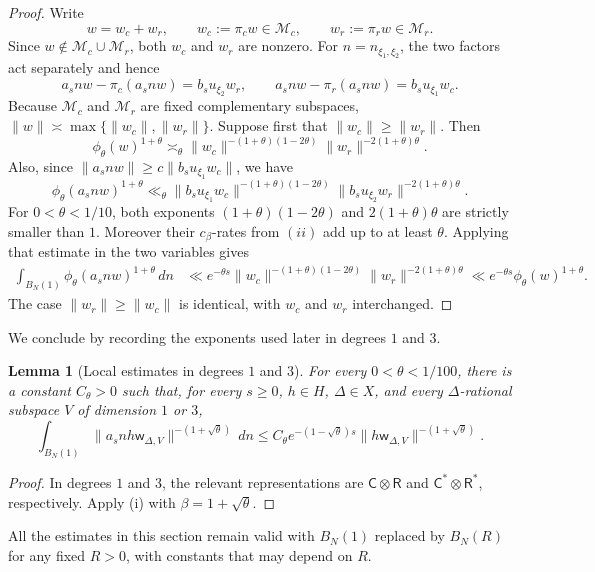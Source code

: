 \documentclass[reqno,11pt]{amsart}
\newtheorem{lem}[lem]{Lemma}
\theoremstyle{definition}
\theoremstyle{remark}
\numberwithin{equation}{section}
\newcommand{\cM}{\mathcal M}
\begin{document}
\begin{proof}
Write
$$
w=w_c+w_r,
\qquad
w_c:=\pi_cw\in\cM_c,
\qquad
w_r:=\pi_rw\in\cM_r.
$$
Since $w\notin\cM_c\cup\cM_r$, both $w_c$ and $w_r$ are nonzero. For
$n=n_{\xi_1,\xi_2}$, the two factors act separately
and hence
$$
a_snw-\pi_c(a_snw)=b_su_{\xi_2}w_r,
\qquad
a_snw-\pi_r(a_snw)=b_su_{\xi_1}w_c.
$$
Because $\cM_c$ and $\cM_r$ are fixed complementary subspaces,
$\|w\|\asymp\max\{\|w_c\|,\|w_r\|\}$. Suppose first that
$\|w_c\|\ge\|w_r\|$. Then
$$
\phi_\theta(w)^{1+\theta}
\asymp_\theta
\|w_c\|^{-(1+\theta)(1-2\theta)}\|w_r\|^{-2(1+\theta)\theta}.
$$
Also, since $\|a_snw\|\ge c\|b_su_{\xi_1}w_c\|$, we have
$$
\phi_\theta(a_snw)^{1+\theta}
\ll_\theta
\|b_su_{\xi_1}w_c\|^{-(1+\theta)(1-2\theta)}
\|b_su_{\xi_2}w_r\|^{-2(1+\theta)\theta}.
$$
For $0<\theta<1/10$, both exponents
$(1+\theta)(1-2\theta)$ and $2(1+\theta)\theta$ are strictly smaller than $1$. Moreover their
$c_\beta$-rates from $(ii)$ add up to at
least $\theta$. Applying that estimate in the two variables gives
$$
\begin{aligned}
\int_{B_N(1)}\phi_\theta(a_snw)^{1+\theta}\,dn
&\ll e^{-\theta s}\|w_c\|^{-(1+\theta)(1-2\theta)}
\|w_r\|^{-2(1+\theta)\theta}\ll  e^{-\theta s}\phi_\theta(w)^{1+\theta}.
\end{aligned}
$$
The case $\|w_r\|\ge\|w_c\|$ is identical, with $w_c$ and $w_r$ interchanged.
\end{proof}



We conclude by recording the exponents used later in degrees $1$ and $3$.

\begin{lem}[Local estimates in degrees $1$ and $3$]
\label{lem:local-dim-1-3-d2}
For every $0<\theta<1/100$, there is a constant $C_\theta>0$ such that,
for every $s\ge0$, $h\in H$, $\Delta\in X$, and every
$\Delta$-rational subspace $V$ of dimension $1$ or $3$,
$$
\int_{B_N(1)}
\|a_snh\mathsf w_{\Delta,V}\|^{-(1+\sqrt\theta)}\,dn
\le
C_\theta e^{-(1-\sqrt\theta)s}
\|h\mathsf w_{\Delta,V}\|^{-(1+\sqrt\theta)}.
$$
\end{lem}

\begin{proof}
In degrees $1$ and $3$, the relevant representations are
$\mathsf C\otimes\mathsf R$ and
$\mathsf C^*\otimes\mathsf R^*$, respectively. Apply
\textnormal{(i)} with
$\beta=1+\sqrt\theta$.
\end{proof}
All the estimates in this section remain valid with $B_N(1)$ replaced by
$B_N(R)$ for any fixed $R>0$, with constants that may depend on $R$.
\end{document}
